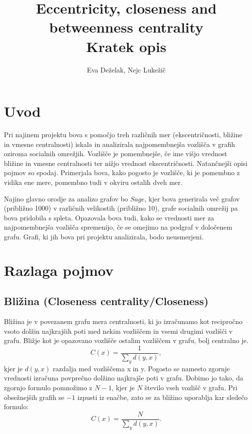 \documentclass[12pt,a4paper]{amsart}
\begin{document}
\title{Eccentricity, closeness and betweenness centrality \\
\small Kratek opis}

\author{Eva Deželak, Nejc Lukežič}
\maketitle

\section{Uvod}
Pri najinem projektu bova s pomočjo treh različnih mer (ekscentričnosti, bližine in vmesne centralnosti) iskala in analizirala najpomembnejša vozlišča v grafih oziroma socialnih omrežjih. Vozlišče je pomembnejše, če ime višjo vrednost bližine in vmesne centralnosti ter nižjo vrednost ekscentričnosti. Natančnejši opisi pojmov so spodaj. Primerjala bova, kako pogosto je vozlišče, ki je pomembno z vidika ene mere, pomembno tudi v okviru ostalih dveh mer.

Najino glavno orodje za analizo grafov bo $Sage$, kjer bova generirala več grafov (približno 1000) v različnih velikostih (približno 10), grafe socialnih omrežij pa bova pridobila s spleta. Opazovala bova tudi, kako se vrednosti mer za najpomembnejša vozlišča spremenijo, če se omejimo na podgraf v določenem grafu. Grafi, ki jih bova pri projektu analizirala, bodo neusmerjeni.

\section{Razlaga pojmov}

\subsection{Bližina (Closeness centrality/Closeness)}

Bližina je v povezanem grafu mera centralnosti, ki jo izračunamo kot recipročno vsoto dolžin najkrajših poti med nekim vozliščem in vsemi drugimi vozlišči v grafu. Bližje kot je opazovano vozlišče ostalim vozliščem v grafu, bolj centralno je.
$$C(x) = \frac{1}{\sum_{y}^{} d(y,x)}, $$
kjer je $d(y, x)$ razdalja med vozliščema x in y. 
Pogosto se namesto zgornje vrednosti izračuna povprečno dolžino najkrajše poti v grafu. Dobimo jo tako, da zgornjo formulo pomnožimo z $N-1$, kjer je $N$ število vseh vozlišč v grafu. Pri obsežnejših grafih se $-1$ izpusti iz enačbe, zato se za bližino uporablja kar sledečo formulo:
$$C(x) = \frac{N}{\sum_{y}^{} d(y,x)}.$$
\end{document}

